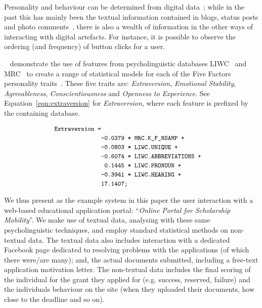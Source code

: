 \documentclass[letterpaper]{article}
\begin{document}
Personality and behaviour can be determined from digital
data~\cite{pennebaker-et-al:2001,vazire+gosling:2004,iacobelli-et-al:2011,oatley+crick:2014};
while in the past this has mainly been the textual information
contained in blogs, status posts and photo
comments~\cite{blamey-et-al-2012,blamey-et-al-2013}, there is also a
wealth of information in the other ways of interacting with digital
artefacts. For instance, it is possible to observe the ordering (and
frequency) of button clicks for a user.

\citeauthor{mairesse-et-al:2007}~
demonstrate the use of features from psycholinguistic databases
LIWC~\cite{pennebaker-et-al:2001} and MRC~\cite{wilson:1988} to create
a range of statistical models for each of the Five Factors personality
traits~\cite{norman:1963,peabody+goldberg:1989,goldberg:1990}. These
five traits are: {\emph{Extraversion}}, {\emph{Emotional Stability}},
{\emph{Agreeableness}}, {\emph{Conscientiousness}} and {\emph{Openness
to Experience}}. See Equation~\ref{eqn:extraversion} for
{\emph{Extraversion}}, where each feature is prefixed by the
containing database.

\begin{equation}\label{eqn:extraversion}
\small
\begin{aligned}
\verb!Extraversion =!\\
&\verb!-0.0379 * MRC.K_F_NSAMP +!\\
&\verb!-0.0803 * LIWC.UNIQUE +!\\
&\verb!-0.6074 * LIWC.ABBREVIATIONS +!\\
&\verb! 0.1445 * LIWC.PRONOUN +!\\
&\verb!-0.3941 * LIWC.HEARING +!\\  
&\verb!17.1407;!
\end{aligned}
\end{equation}

We thus present as the example system in this paper the user
interaction with a web-based educational application portal:
``{\emph{Online Portal for Scholarship Mobility}}''. We make use of
textual data, analysing with these same psycholinguistic techniques,
and employ standard statistical methods on non-textual data. The
textual data also includes interaction with a dedicated Facebook page
dedicated to resolving problems with the applications (of which there
were/are many); and, the actual documents submitted, including a
free-text application motivation letter. The non-textual data includes
the final scoring of the individual for the grant they applied for
(e.g. success, reserved, failure) and the individuals behaviour on the
site (when they uploaded their documents, how close to the deadline
and so on).
\end{document}
